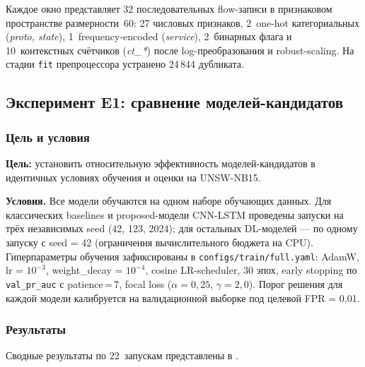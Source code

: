 Каждое окно представляет 32 последовательных flow-записи в признаковом
пространстве размерности~60: 27 числовых признаков, 2~one-hot
категориальных (\emph{proto, state}), 1~frequency-encoded
(\emph{service}), 2~бинарных флага и 10~контекстных счётчиков
(\emph{ct\_*}) после log-преобразования и robust-scaling. На стадии
\texttt{fit} препроцессора устранено 24\,844 дубликата.

\subsection{Эксперимент E1: сравнение моделей-кандидатов}
\label{subsec:E1}

\subsubsection{Цель и условия}

\textbf{Цель:} установить относительную эффективность моделей-кандидатов
в идентичных условиях обучения и оценки на UNSW-NB15.

\textbf{Условия.} Все модели обучаются на одном наборе обучающих
данных. Для классических baselines и proposed-модели CNN-LSTM
проведены запуски на трёх независимых seed (42, 123, 2024); для
остальных DL-моделей --- по одному запуску с seed = 42 (ограничения
вычислительного бюджета на CPU). Гиперпараметры обучения зафиксированы
в \verb|configs/train/full.yaml|: AdamW, lr = \(10^{-3}\),
weight\_decay = \(10^{-4}\), cosine LR-scheduler, 30 эпох,
early stopping по \texttt{val\_pr\_auc} с patience\,=\,7,
focal loss (\(\alpha = 0{,}25\), \(\gamma = 2{,}0\)).
Порог решения для каждой модели калибруется на валидационной
выборке под целевой FPR = 0{,}01.

\subsubsection{Результаты}

Сводные результаты по 22~запускам представлены в
.

